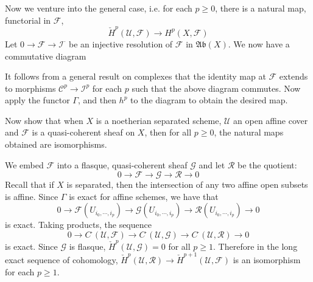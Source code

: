 \documentclass[12pt]{article}
\theoremstyle{plain}
\theoremstyle{definition}
\newcommand{\sU}{\mathcal{U}}
\newcommand{\shC}{\mathscr{C}}
\newcommand{\shF}{\mathscr{F}}
\newcommand{\shG}{\mathscr{G}}
\newcommand{\shI}{\mathscr{I}}
\newcommand{\shR}{\mathscr{R}}
\newcommand{\id}{\rm id}
\newcommand{\<}{\langle}
\renewcommand{\>}{\rangle}
\newcommand{\Ab}{\mathfrak{Ab}}
\newcommand{\cH}{\check{H}}
\begin{document}
Now we venture into the general case, i.e. for each $p \ge 0$, there is a natural map, functorial in $\shF$, 
$$ \cH^p (\sU, \shF) \to H^p(X, \shF)$$
Let $0 \to \shF \to \shI^\cdot$ be an injective resolution of $\shF$ in $\Ab(X)$. We now have a commutative diagram 

\begin{center}
\end{center}
It follows from a general result on complexes that the identity map at $\shF$ extends to morphisms $\shC^p \to \shI^p$ for each $p$ such that the above diagram commutes. Now apply the functor $\Gamma$, and then $h^p$ to the diagram to obtain the desired map. 

Now show that when $X$ is a noetherian separated scheme, $\sU$ an open affine cover and $\shF$ is a quasi-coherent sheaf on $X$, then for all $p \ge 0$, the natural maps obtained are isomorphisms. 

We embed $\shF$ into a flasque, quasi-coherent sheaf $\shG$ and let $\shR$ be the quotient: 
$$ 0 \to \shF \to \shG \to \shR \to 0 $$
Recall that if $X$ is separated, then the intersection of any two affine open subsets is affine. Since $\Gamma$ is exact for affine schemes, we have that 
$$ 0 \to \shF(U_{i_0, \cdots, i_p}) \to \shG(U_{i_0, \cdots, i_p}) \to \shR(U_{i_0, \cdots, i_p}) \to 0 $$
is exact. Taking products, the sequence
$$ 0 \to C^\cdot (\sU, \shF) \to C^\cdot (\sU, \shG) \to C^\cdot (\sU, \shR) \to 0 $$
is exact. Since $\shG$ is flasque, $\cH^p(\sU, \shG) = 0$ for all $p \ge 1$. Therefore in the long exact sequence of cohomology, $\cH^p(\sU, \shR) \to \cH^{p + 1}(\sU, \shF)$ is an isomorphism for each $p \ge 1$. 

\begin{center}
\end{center}
\end{document}
